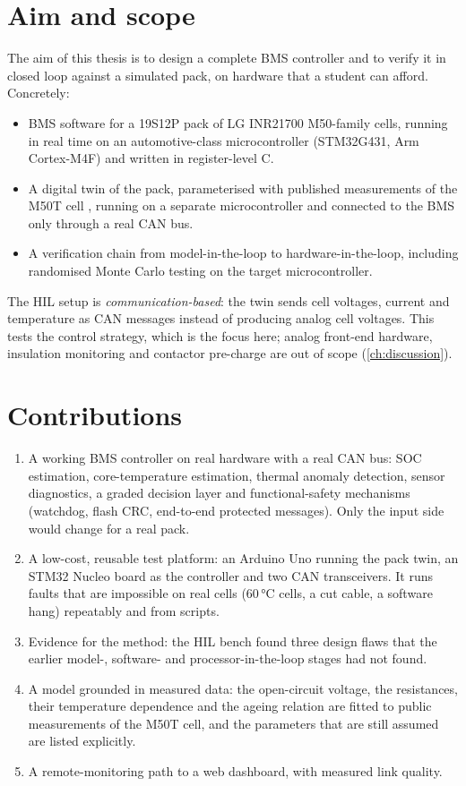 \section{Aim and scope}
The aim of this thesis is to design a complete BMS controller and to verify it in closed loop against a simulated pack, on hardware that a student can afford. Concretely:
\begin{itemize}
  \item BMS software for a 19S12P pack of LG INR21700 M50-family cells, running in real time on an automotive-class microcontroller (STM32G431, Arm Cortex-M4F) and written in register-level C.
  \item A digital twin of the pack, parameterised with published measurements of the M50T cell \citep{kirkaldy2024}, running on a separate microcontroller and connected to the BMS only through a real CAN bus.
  \item A verification chain from model-in-the-loop to hardware-in-the-loop, including randomised Monte Carlo testing on the target microcontroller.
\end{itemize}
The HIL setup is \emph{communication-based}: the twin sends cell voltages, current and temperature as CAN messages instead of producing analog cell voltages. This tests the control strategy, which is the focus here; analog front-end hardware, insulation monitoring and contactor pre-charge are out of scope (\cref{ch:discussion}).

\section{Contributions}
\begin{enumerate}
  \item A working BMS controller on real hardware with a real CAN bus: SOC estimation, core-temperature estimation, thermal anomaly detection, sensor diagnostics, a graded decision layer and functional-safety mechanisms (watchdog, flash CRC, end-to-end protected messages). Only the input side would change for a real pack.
  \item A low-cost, reusable test platform: an Arduino Uno running the pack twin, an STM32 Nucleo board as the controller and two CAN transceivers. It runs faults that are impossible on real cells (60\,°C cells, a cut cable, a software hang) repeatably and from scripts.
  \item Evidence for the method: the HIL bench found three design flaws that the earlier model-, software- and processor-in-the-loop stages had not found.
  \item A model grounded in measured data: the open-circuit voltage, the resistances, their temperature dependence and the ageing relation are fitted to public measurements of the M50T cell, and the parameters that are still assumed are listed explicitly.
  \item A remote-monitoring path to a web dashboard, with measured link quality.
\end{enumerate}

